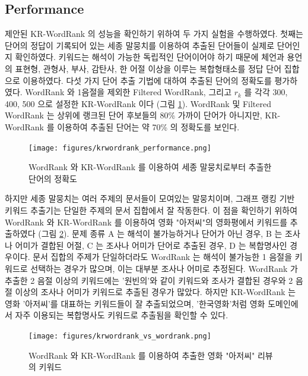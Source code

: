 \documentclass[11pt]{article}
\begin{document}
\subsection{Performance}

제안된 KR-WordRank 의 성능을 확인하기 위하여 두 가지 실험을 수행하였다.
첫째는 단어의 정답이 기록되어 있는 세종 말뭉치를 이용하여 추출된 단어들이 실제로 단어인지 확인하였다.
키워드는 해석이 가능한 독립적인 단어이어야 하기 때문에 체언과 용언의 표현형, 관형사, 부사, 감탄사, 한 어절 이상을 이루는 복합형태소를 정답 단어 집합으로 이용하였다.
다섯 가지 단어 추출 기법에 대하여 추출된 단어의 정확도를 평가하였다.
WordRank 와 1음절을 제외한 Filtered WordRank, 그리고 $r_k$ 를 각각 300, 400, 500 으로 설정한 KR-WordRank 이다 (그림 \ref{fig:krwordrank_performance}).
WordRank 및 Filtered WordRank 는 상위에 랭크된 단어 후보들의 80\% 가까이 단어가 아니지만, KR-WordRank 를 이용하여 추출된 단어는 약 70\% 의 정확도를 보인다.

\begin{figure}[H]
\centering
\label{fig:krwordrank_performance}
\texttt{[image: figures/krwordrank\_performance.png]}
\caption{WordRank 와 KR-WordRank 를 이용하여 세종 말뭉치로부터 추출한 단어의 정확도}
\end{figure}

하지만 세종 말뭉치는 여러 주제의 문서들이 모여있는 말뭉치이며, 그래프 랭킹 기반 키워드 추출기는 단일한 주제의 문서 집합에서 잘 작동한다.
이 점을 확인하기 위하여 WordRank 와 KR-WordRank 를 이용하여 영화 "아저씨"의 영화평에서 키워드를 추출하였다 (그림 \ref{fig:krwordrank_vs_wordrank}).
문제 종류 A 는 해석이 불가능하거나 단어가 아닌 경우, B 는 조사나 어미가 결합된 어절, C 는 조사나 어미가 단어로 추출된 경우, D 는 복합명사인 경우이다.
문서 집합의 주제가 단일하더라도 WordRank 는 해석이 불가능한 1 음절을 키워드로 선택하는 경우가 많으며, 이는 대부분 조사나 어미로 추정된다.
WordRank 가 추출한 2 음절 이상의 키워드에는 '원빈의'와 같이 키워드와 조사가 결합된 경우와 2 음절 이상의 조사나 어미가 키워드로 추출된 경우가 많았다.
하지만 KR-WordRank 는 영화 '아저씨'를 대표하는 키워드들이 잘 추출되었으며, '한국영화'처럼 영화 도메인에서 자주 이용되는 복합명사도 키워드로 추출됨을 확인할 수 있다.

\begin{figure}[H]
\centering
\label{fig:krwordrank_vs_wordrank}
\texttt{[image: figures/krwordrank\_vs\_wordrank.png]}
\caption{WordRank 와 KR-WordRank 를 이용하여 추출한 영화 "아저씨" 리뷰의 키워드}
\end{figure}
\end{document}
